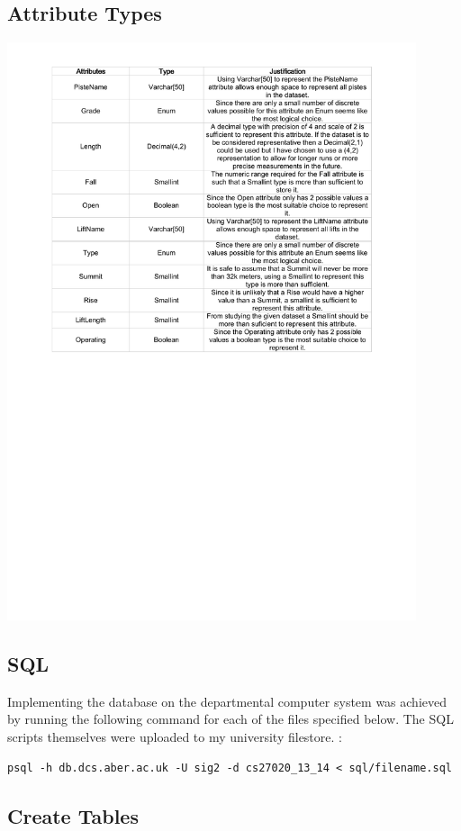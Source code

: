 \documentclass[titlepage ,12pt]{article}
\begin{document}
\subsection{Attribute Types}
\includegraphics[width=0.9\textwidth]{images/types}
\subsection{SQL}
Implementing the database on the departmental computer system was achieved by running the following command for each of the files specified below. The SQL scripts themselves were uploaded to my university filestore. :
 

\begin{verbatim}
psql -h db.dcs.aber.ac.uk -U sig2 -d cs27020_13_14 < sql/filename.sql
\end{verbatim}

\subsection{Create Tables}

\FloatBarrier
\end{document}
